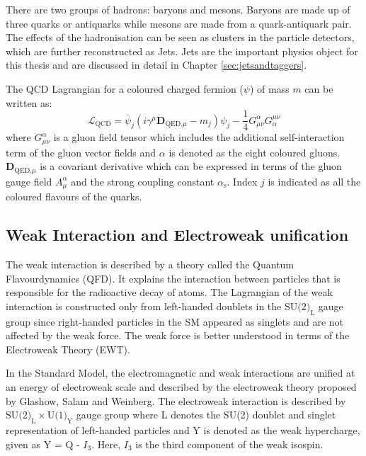 There are two groups of hadrons: baryons and mesons. Baryons are made up of three quarks or antiquarks while mesons are made from a quark-antiquark pair. The effects of the hadronisation can be seen as clusters in the particle detectors, which are further reconstructed as Jets. Jets are the important physics object for this thesis and are discussed in detail in Chapter \ref{sec:jetsandtaggers}.

The QCD Lagrangian for a coloured charged fermion ($\psi$) of mass $m$ can be written as:
\begin{equation}
\mathcal{L}_{\text{QCD}} = \bar{\psi}_{j}(i\gamma^{\mu}\textbf{D}_{\text{QED,}\mu} - m_{j})\psi_{j} - \frac{1}{4}G_{\mu\nu}^{\alpha}G^{\mu\nu}_{\alpha}
\end{equation}
where $G_{\mu\nu}^{\alpha}$ is a gluon field tensor which includes the additional self-interaction term of the gluon vector fields and $\alpha$ is denoted as the eight coloured gluons. $\textbf{D}_{\text{QED,}\mu}$ is a covariant derivative which can be expressed in terms of the gluon gauge field $A_{\mu}^{\alpha}$ and the strong coupling constant $\alpha_{\text{s}}$. Index $j$ is indicated as all the coloured flavours of the quarks.~\cite{halzen}

\subsection{Weak Interaction and Electroweak unification}%
\label{sec:theory:standardmodel:weak}
The weak interaction is described by a theory called the Quantum Flavourdynamics (QFD). It explains the interaction between particles that is responsible for the radioactive decay of atoms. The Lagrangian of the weak interaction is constructed only from left-handed doublets in the $\text{SU(2)}_{\text{L}}$ gauge group since right-handed particles in the SM appeared as singlets and are not affected by the weak force. The weak force is better understood in terms of the Electroweak Theory (EWT).~\cite{halzen}


In the Standard Model, the electromagnetic and weak interactions are unified at an energy of electroweak scale and described by the electroweak theory proposed by Glashow, Salam and Weinberg. The electroweak interaction is described by $\text{SU(2)}_{\text{L}} \times \text{U(1)}_{\text{Y}}$ gauge group where L denotes the SU(2) doublet and singlet representation of left-handed particles and Y is denoted as the weak hypercharge, given as Y = Q - $I_{3}$. Here, $I_{3}$ is the third component of the weak isospin.

